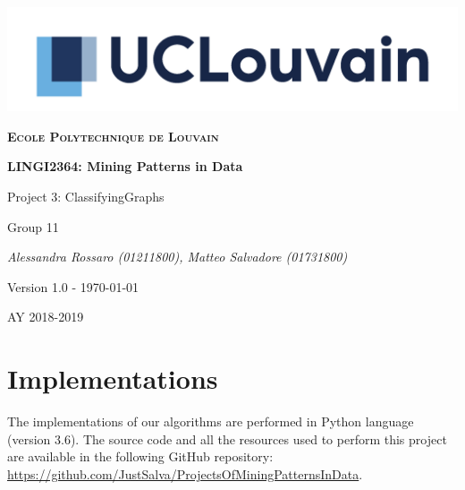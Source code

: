 \documentclass[10pt, a4paper]{article}
\begin{document}
	\begin{titlepage}
		\centering
		\includegraphics[scale =0.8]{logo.jpg}\par\vspace{1cm}
		{\scshape\LARGE\bfseries Ecole Polytechnique de Louvain\par}
		\vspace{1.5cm}
		{\scshape\Large \par}
		\vspace{1.5cm}
		{\huge\bfseries LINGI2364: Mining Patterns in Data \par}
		\vspace{1cm}
		{\Huge Project 3: ClassifyingGraphs \par}
		\vspace{2cm}
		{\LARGE Group 11\par}
		\vspace{1cm}
		{\Large\itshape Alessandra Rossaro (01211800), Matteo Salvadore (01731800)\par}
		\vspace{2cm}
		{\small Version 1.0 - \today\par}

		\vfill

		{\large AY 2018-2019\par}
	\end{titlepage}

	\section{Implementations}
		The implementations of our algorithms are performed in Python language (version 3.6).
		The source code and all the resources used to perform this project are available in the following GitHub repository: \url{https://github.com/JustSalva/ProjectsOfMiningPatternsInData}.\newline
	
\end{document}

